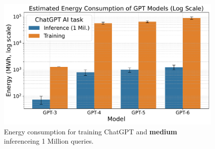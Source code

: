 \begin{table}[tb]
\centering
\caption{Estimated Energy Consumption of GPT Models for Training and Inference 
(based on \cite{brown2020language, patterson2021carbon, medium2023gpt4carbon, 
extremenetworks2023energy, epochai2024compute, hackernoon2024dirtysecret}).}
\label{tab:energy-chatgpt}
\end{table}

\begin{figure}[tb]
    \centering
    \includegraphics[width=1.0\linewidth]{images/gpt_energy_comparison.pdf}
    \caption{Energy consumption for training ChatGPT and {\bf medium} inferenceing 1 Million queries.}
    \label{fig:placeholder}
\end{figure}


